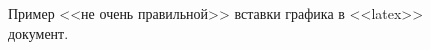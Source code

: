 \documentclass[a4paper,14pt,russian]{extreport}
\begin{document}
\begin{figure}
\caption{Пример <<не очень правильной>> вставки графика в <<latex>> документ.}
\label{pic:example}
\end{figure}
\end{document}
